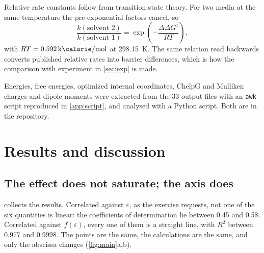 \documentclass[10pt,a4paper]{article}
\begin{document}
Relative rate constants follow from transition state theory. For two media at the
same temperature the pre-exponential factors cancel, so
%
\begin{equation}
  \frac{k(\text{solvent 2})}{k(\text{solvent 1})}
  = \exp\!\left(-\frac{\Delta\Delta G^{\ddagger}}{RT}\right),
  \label{eq:tst}
\end{equation}
%
with $RT = \SI{0.592}{\kilo\calorie\per\mole}$ at \SI{298.15}{\kelvin}. The same
relation read backwards converts published relative rates into barrier differences,
which is how the comparison with experiment in \cref{sec:exp} is made.

Energies, free energies, optimized internal coordinates, ChelpG and Mulliken charges
and dipole moments were extracted from the 33 output files with an \texttt{awk}
script reproduced in \cref{app:script}, and analysed with a Python script. Both are
in the repository.

\section{Results and discussion}

\subsection{The effect does not saturate; the axis does}

 collects the results. Correlated against $\varepsilon$, as the
exercise requests, not one of the six quantities is linear: the coefficients of
determination lie between 0.45 and 0.58. Correlated against $f(\varepsilon)$, every
one of them is a straight line, with $R^{2}$ between 0.977 and 0.9998. The points
are the same, the calculations are the same, and only the abscissa changes
(\cref{fig:main}a,b).
\end{document}
